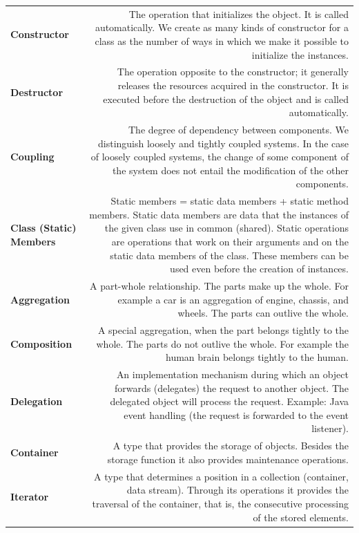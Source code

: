 \documentclass[margin=0px]{article}
\begin{document}
\begin{longtable}{L R}
\textbf{Constructor} &
The operation that initializes the object. It is called automatically. We create as many kinds of constructor for a class as the number of ways in which we make it possible to initialize the instances. \\[4pt]

\textbf{Destructor} &
The operation opposite to the constructor; it generally releases the resources acquired in the constructor. It is executed before the destruction of the object and is called automatically. \\[4pt]

\textbf{Coupling} &
The degree of dependency between components. We distinguish loosely and tightly coupled systems. In the case of loosely coupled systems, the change of some component of the system does not entail the modification of the other components. \\[4pt]

\textbf{Class (Static) Members} &
Static members = static data members + static method members. Static data members are data that the instances of the given class use in common (shared). Static operations are operations that work on their arguments and on the static data members of the class. These members can be used even before the creation of instances. \\[4pt]

\textbf{Aggregation} &
A part-whole relationship. The parts make up the whole. For example a car is an aggregation of engine, chassis, and wheels. The parts can outlive the whole. \\[4pt]

\textbf{Composition} &
A special aggregation, when the part belongs tightly to the whole. The parts do not outlive the whole. For example the human brain belongs tightly to the human. \\[4pt]

\textbf{Delegation} &
An implementation mechanism during which an object forwards (delegates) the request to another object. The delegated object will process the request. Example: Java event handling (the request is forwarded to the event listener). \\[4pt]

\textbf{Container} &
A type that provides the storage of objects. Besides the storage function it also provides maintenance operations. \\[4pt]

\textbf{Iterator} &
A type that determines a position in a collection (container, data stream). Through its operations it provides the traversal of the container, that is, the consecutive processing of the stored elements. \\[4pt]


\end{longtable}
\end{document}
